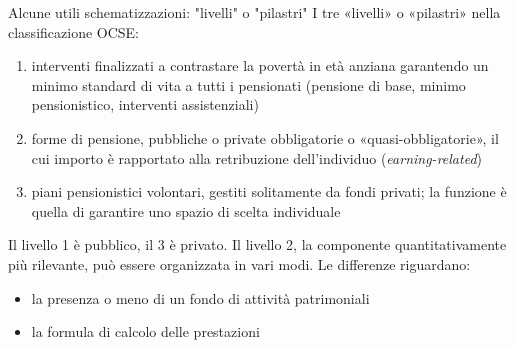 \documentclass[aspectratio=64,11pt]{beamer}
\begin{document}
\begin{frame}{Alcune utili schematizzazioni: "livelli" o "pilastri"}
I tre «livelli» o «pilastri» nella classificazione OCSE:
\begin{enumerate}
\item interventi finalizzati a contrastare la povertà in età anziana garantendo
un minimo standard di vita a tutti i pensionati (pensione di base, minimo
pensionistico, interventi assistenziali)
\item forme di pensione, pubbliche o private obbligatorie o «quasi-obbligatorie»,
il cui importo è rapportato alla retribuzione dell’individuo
(\emph{earning-related})
\item piani pensionistici volontari, gestiti solitamente da fondi privati; la
funzione è quella di garantire uno spazio di scelta individuale
\end{enumerate}

Il livello 1 è pubblico, il 3 è privato. Il livello 2, la componente
quantitativamente più rilevante, può essere organizzata in vari modi. Le differenze riguardano:
\begin{itemize}
\item la presenza o meno di un fondo di attività patrimoniali
\item la formula di calcolo delle prestazioni
\end{itemize}
\end{frame}
\end{document}
